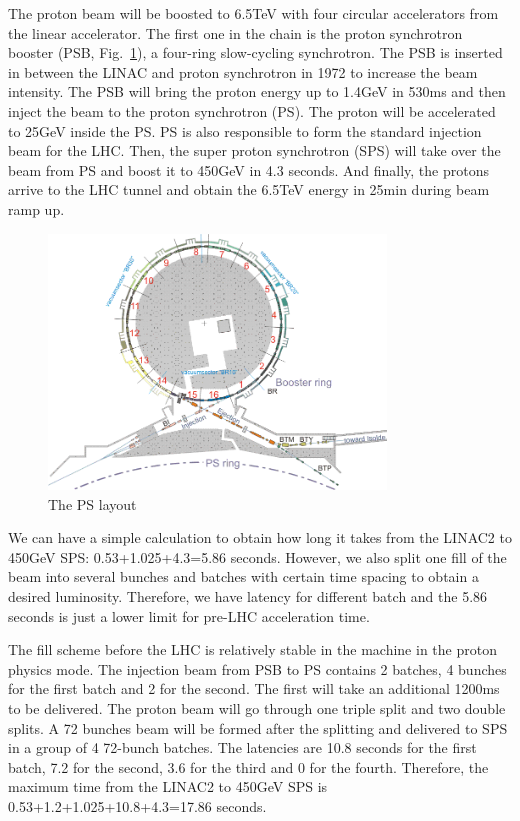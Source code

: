 The proton beam will be boosted to 6.5TeV with four circular accelerators from the linear accelerator. The first one in the chain is the proton synchrotron booster (PSB, Fig.~\ref{fig:c3lhcpsb}), a four-ring slow-cycling synchrotron. The PSB is inserted in between the LINAC and proton synchrotron in 1972 to increase the beam intensity. The PSB will bring the proton energy up to 1.4GeV in 530ms and then inject the beam to the proton synchrotron (PS). The proton will be accelerated to 25GeV inside the PS. PS is also responsible to form the standard injection beam for the LHC. Then, the super proton synchrotron (SPS) will take over the beam from PS and boost it to 450GeV in 4.3 seconds. And finally, the protons arrive to the LHC tunnel and obtain the 6.5TeV energy in 25min during beam ramp up. 

\begin{figure}[htbp]
 \begin{center}
  \includegraphics[width=0.8\textwidth]{figures/c3/c3_lhc_psb.png}
 \end{center}
 \caption{The PS layout}
 \label{fig:c3lhcpsb}
\end{figure}

We can have a simple calculation to obtain how long it takes from the LINAC2 to 450GeV SPS: 0.53+1.025+4.3=5.86 seconds. However, we also split one fill of the beam into several bunches and batches with certain time spacing to obtain a desired luminosity. Therefore, we have latency for different batch and the 5.86 seconds is just a lower limit for pre-LHC acceleration time. 

The fill scheme before the LHC is relatively stable in the machine in the proton physics mode. The injection beam from PSB to PS contains 2 batches, 4 bunches for the first batch and 2 for the second. The first will take an additional 1200ms to be delivered. The proton beam will go through one triple split and two double splits. A 72 bunches beam will be formed after the splitting and delivered to SPS in a group of 4 72-bunch batches. The latencies are 10.8 seconds for the first batch, 7.2 for the second, 3.6 for the third and 0 for the fourth. Therefore, the maximum time from the LINAC2 to 450GeV SPS is 0.53+1.2+1.025+10.8+4.3=17.86 seconds. 

